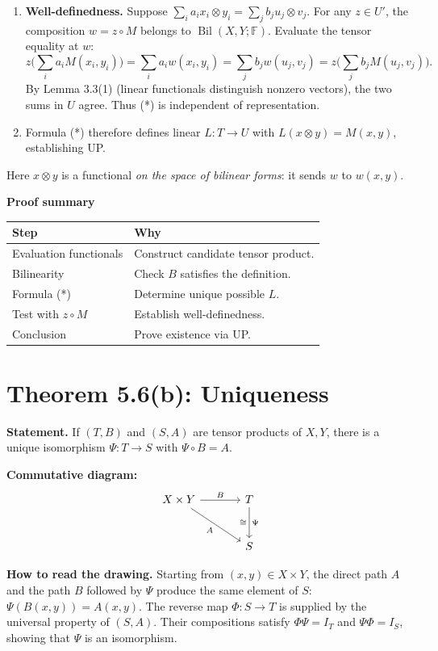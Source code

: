 \documentclass[11pt,a4paper]{article}
\newcommand{\F}{\mathbb F}
\newenvironment{proofsteps}{\begin{enumerate}\setlength{\itemsep}{4pt}}{\end{enumerate}}
\newcommand{\prooftable}[1]{\medskip\textbf{Proof summary}\par\smallskip #1\medskip}
\begin{document}
\begin{proofsteps}
\[\]
Since every element of \(T\) is a linear combination of pure tensors, the formula prescribes \(L\) on \emph{every} element of \(T\). Thus any linear map satisfying \(L(x\otimes y)=M(x,y)\) must use this formula; there can be at most one such \(L\). We still have to check that different representations of the same tensor give the same result.
\item \textbf{Well-definedness.} Suppose \(\sum_i a_ix_i\otimes y_i=\sum_j b_ju_j\otimes v_j\). For any \(z\in U'\), the composition \(w=z\circ M\) belongs to \(\operatorname{Bil}(X,Y;\F)\). Evaluate the tensor equality at \(w\):
\[
z\Big(\sum_i a_iM(x_i,y_i)\Big)
=\sum_i a_iw(x_i,y_i)
=\sum_j b_jw(u_j,v_j)
=z\Big(\sum_j b_jM(u_j,v_j)\Big).
\]
By Lemma 3.3(1) (linear functionals distinguish nonzero vectors), the two sums in \(U\) agree. Thus (*) is independent of representation.
\item Formula (*) therefore defines linear \(L:T\to U\) with \(L(x\otimes y)=M(x,y)\), establishing UP.
\end{proofsteps}
\begin{personalnote}
Here \(x\otimes y\) is a functional \emph{on the space of bilinear forms}: it sends \(w\) to \(w(x,y)\).
\end{personalnote}
\prooftable{\begin{tabularx}{\linewidth}{@{}p{.28\linewidth}X@{}}\hline
Step & Why\\\hline
Evaluation functionals & Construct candidate tensor product.\\
Bilinearity & Check \(B\) satisfies the definition.\\
Formula (*) & Determine unique possible \(L\).\\
Test with \(z\circ M\) & Establish well-definedness.\\
Conclusion & Prove existence via UP.\\\hline
\end{tabularx}}

\section*{Theorem 5.6(b): Uniqueness}
\textbf{Statement.} If \((T,B)\) and \((S,A)\) are tensor products of \(X,Y\), there is a unique isomorphism \(\Psi:T\to S\) with \(\Psi\circ B=A\).

\textbf{Commutative diagram:}
\[
 \begin{tikzcd}[row sep=large, column sep=large]
 X\times Y \arrow[r,"B"] \arrow[dr,swap,"A"] & T \arrow[d,"\Psi", "\cong"']\\
 & S
 \end{tikzcd}
\]
\begin{personalnote}
\textbf{How to read the drawing.} Starting from \((x,y)\in X\times Y\), the direct path \(A\) and the path \(B\) followed by \(\Psi\) produce the same element of \(S\):
\(\Psi(B(x,y))=A(x,y)\). The reverse map \(\Phi:S\to T\) is supplied by the universal property of \((S,A)\). Their compositions satisfy \(\Phi\Psi=I_T\) and \(\Psi\Phi=I_S\), showing that \(\Psi\) is an isomorphism.
\end{personalnote}
\end{document}
